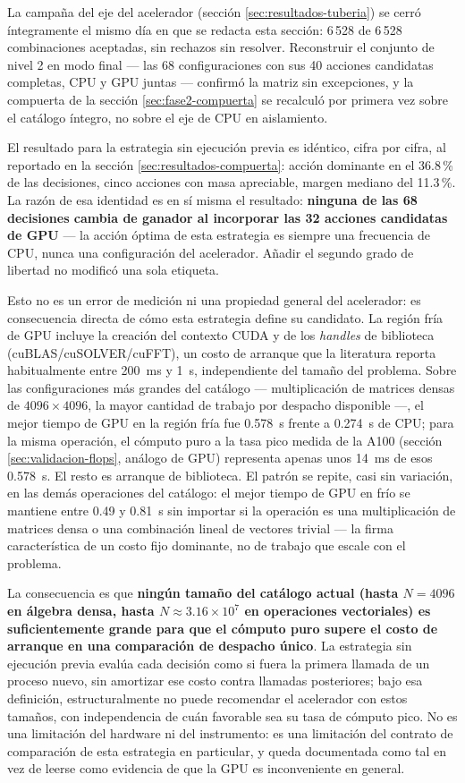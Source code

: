 \documentclass[12pt,oneside,spanish]{book}
\begin{document}
La campaña del eje del acelerador (sección \ref{sec:resultados-tuberia}) se cerró íntegramente el mismo día en que se redacta esta sección: 6\,528 de 6\,528 combinaciones aceptadas, sin rechazos sin resolver. Reconstruir el conjunto de nivel 2 en modo final --- las 68 configuraciones con sus 40 acciones candidatas completas, CPU y GPU juntas --- confirmó la matriz sin excepciones, y la compuerta de la sección \ref{sec:fase2-compuerta} se recalculó por primera vez sobre el catálogo íntegro, no sobre el eje de CPU en aislamiento.

El resultado para la estrategia sin ejecución previa es idéntico, cifra por cifra, al reportado en la sección \ref{sec:resultados-compuerta}: acción dominante en el 36.8\,\% de las decisiones, cinco acciones con masa apreciable, margen mediano del 11.3\,\%. La razón de esa identidad es en sí misma el resultado: \textbf{ninguna de las 68 decisiones cambia de ganador al incorporar las 32 acciones candidatas de GPU} --- la acción óptima de esta estrategia es siempre una frecuencia de CPU, nunca una configuración del acelerador. Añadir el segundo grado de libertad no modificó una sola etiqueta.

Esto no es un error de medición ni una propiedad general del acelerador: es consecuencia directa de cómo esta estrategia define su candidato. La región fría de GPU incluye la creación del contexto CUDA y de los \textit{handles} de biblioteca (cuBLAS/cuSOLVER/cuFFT), un costo de arranque que la literatura reporta habitualmente entre 200~ms y 1~s, independiente del tamaño del problema. Sobre las configuraciones más grandes del catálogo --- multiplicación de matrices densas de $4096\times4096$, la mayor cantidad de trabajo por despacho disponible ---, el mejor tiempo de GPU en la región fría fue 0.578~s frente a 0.274~s de CPU; para la misma operación, el cómputo puro a la tasa pico medida de la A100 (sección \ref{sec:validacion-flops}, análogo de GPU) representa apenas unos 14~ms de esos 0.578~s. El resto es arranque de biblioteca. El patrón se repite, casi sin variación, en las demás operaciones del catálogo: el mejor tiempo de GPU en frío se mantiene entre 0.49 y 0.81~s sin importar si la operación es una multiplicación de matrices densa o una combinación lineal de vectores trivial --- la firma característica de un costo fijo dominante, no de trabajo que escale con el problema.

La consecuencia es que \textbf{ningún tamaño del catálogo actual (hasta $N=4096$ en álgebra densa, hasta $N\approx3.16\times10^7$ en operaciones vectoriales) es suficientemente grande para que el cómputo puro supere el costo de arranque en una comparación de despacho único}. La estrategia sin ejecución previa evalúa cada decisión como si fuera la primera llamada de un proceso nuevo, sin amortizar ese costo contra llamadas posteriores; bajo esa definición, estructuralmente no puede recomendar el acelerador con estos tamaños, con independencia de cuán favorable sea su tasa de cómputo pico. No es una limitación del hardware ni del instrumento: es una limitación del contrato de comparación de esta estrategia en particular, y queda documentada como tal en vez de leerse como evidencia de que la GPU es inconveniente en general.
\end{document}
